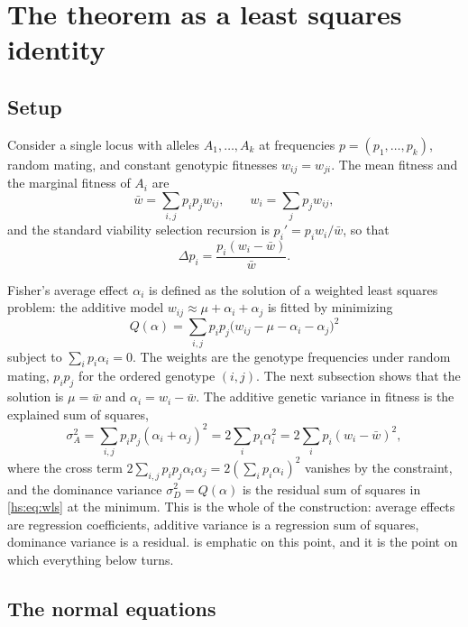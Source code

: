 \section{The theorem as a least squares identity}
\label{hs:sec:ftns}

\subsection{Setup}

Consider a single locus with alleles $A_1,\ldots,A_k$ at frequencies $p = (p_1,\ldots,p_k)$, random mating, and constant genotypic fitnesses $w_{ij} = w_{ji}$. The mean fitness and the marginal fitness of $A_i$ are
\[
\bar w = \sum_{i,j} p_i p_j w_{ij}, \qquad w_i = \sum_j p_j w_{ij},
\]
and the standard viability selection recursion is $p_i' = p_i w_i/\bar w$, so that
\begin{equation}
\Delta p_i = \frac{p_i (w_i - \bar w)}{\bar w}.
\label{hs:eq:recursion}
\end{equation}

Fisher's average effect $\alpha_i$ is defined as the solution of a weighted least squares problem: the additive model $w_{ij} \approx \mu + \alpha_i + \alpha_j$ is fitted by minimizing
\begin{equation}
Q(\alpha) = \sum_{i,j} p_i p_j \big(w_{ij} - \mu - \alpha_i - \alpha_j\big)^2
\label{hs:eq:wls}
\end{equation}
subject to $\sum_i p_i \alpha_i = 0$. The weights are the genotype frequencies under random mating, $p_ip_j$ for the ordered genotype $(i,j)$. The next subsection shows that the solution is $\mu = \bar w$ and $\alpha_i = w_i - \bar w$. The additive genetic variance in fitness is the explained sum of squares,
\[
\sigma^2_A = \sum_{i,j} p_ip_j(\alpha_i+\alpha_j)^2 = 2\sum_i p_i \alpha_i^2 = 2\sum_i p_i (w_i - \bar w)^2,
\]
where the cross term $2\sum_{i,j}p_ip_j\alpha_i\alpha_j = 2(\sum_i p_i\alpha_i)^2$ vanishes by the constraint, and the dominance variance $\sigma^2_D = Q(\alpha)$ is the residual sum of squares in \eqref{hs:eq:wls} at the minimum. This is the whole of the construction: average effects are regression coefficients, additive variance is a regression sum of squares, dominance variance is a residual. \citet{hs:ewens2004mathematical} is emphatic on this point, and it is the point on which everything below turns.


\subsection{The normal equations}

